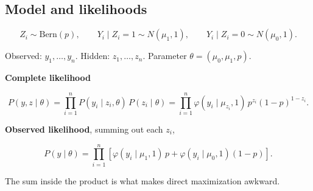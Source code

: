 \documentclass[
  letterpaper,
  DIV=11,
  numbers=noendperiod]{scrreprt}
\begin{document}
\subsection{Model and likelihoods}\label{model-and-likelihoods}

\[
Z_i \sim \text{Bern}(p), \qquad
Y_i \mid Z_i = 1 \sim N(\mu_1, 1), \qquad
Y_i \mid Z_i = 0 \sim N(\mu_0, 1) .
\]

Observed: \(y_1, \ldots, y_n\). Hidden: \(z_1, \ldots, z_n\). Parameter
\(\theta = (\mu_0, \mu_1, p)\).

\textbf{Complete likelihood}

\[
P(y, z \mid \theta) = \prod_{i=1}^{n} P(y_i \mid z_i, \theta) \, P(z_i \mid \theta)
= \prod_{i=1}^{n} \varphi(y_i \mid \mu_{z_i}, 1) \, p^{z_i} (1-p)^{1-z_i} .
\]

\textbf{Observed likelihood}, summing out each \(z_i\),

\[
P(y \mid \theta) = \prod_{i=1}^{n}\left[\varphi(y_i \mid \mu_1, 1)\, p + \varphi(y_i \mid \mu_0, 1)(1 - p)\right] .
\]

The sum inside the product is what makes direct maximization awkward.
\end{document}
